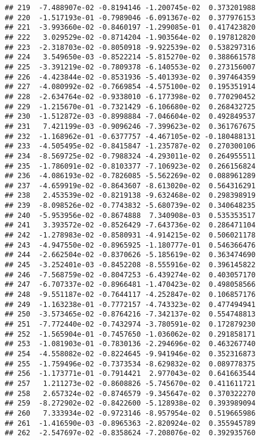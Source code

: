 \documentclass[
]{article}
\begin{document}
\begin{verbatim}
## 219  -7.488907e-02 -0.8194146 -1.200745e-02  0.373201988
## 220  -1.517193e-01 -0.7989046 -6.091367e-02  0.377976153
## 221  -3.993660e-02 -0.8460197 -1.299085e-01  0.417423820
## 222   3.029529e-02 -0.8714204 -1.903564e-02  0.197812820
## 223  -2.318703e-02 -0.8050918 -9.922539e-02  0.538297316
## 224   3.549650e-03 -0.8522214 -5.815270e-02  0.388661578
## 225  -3.391219e-02 -0.7809378 -6.140553e-02  0.273156007
## 226  -4.423844e-02 -0.8531936 -5.401393e-02  0.397464359
## 227  -4.080992e-02 -0.7669854 -4.575100e-02  0.195351914
## 228  -2.634764e-02 -0.9338010 -6.177398e-02  0.770290452
## 229  -1.215670e-01 -0.7321429 -6.106680e-02  0.268432725
## 230  -1.512872e-03 -0.8998884 -7.046604e-02  0.492849537
## 231   7.421199e-03 -0.9096246 -7.399623e-02  0.361767675
## 232  -1.168962e-01 -0.6377757 -4.467105e-02 -0.180488131
## 233  -4.505495e-02 -0.8415847 -1.235787e-02  0.270300106
## 234  -8.569725e-02 -0.7988324 -4.293011e-02  0.264955511
## 235  -1.786091e-02 -0.8103377 -7.106923e-02  0.266156824
## 236  -4.086193e-02 -0.7826085 -5.562269e-02  0.088961289
## 237  -4.659919e-02 -0.8643607 -8.613020e-02  0.564316291
## 238   2.453539e-02 -0.8219138 -9.632468e-02  0.298398919
## 239  -8.098526e-02 -0.7743832 -5.680739e-02  0.340648235
## 240  -5.953956e-02 -0.8674888  7.340908e-03  0.535353517
## 241   3.393572e-02 -0.8526429 -7.643736e-02  0.286471104
## 242  -1.278983e-02 -0.8580931 -4.914215e-02  0.506021178
## 243  -4.947550e-02 -0.8965925 -1.180777e-01  0.546366476
## 244  -2.662504e-02 -0.8370626 -5.185619e-02  0.363474690
## 245  -3.252401e-03 -0.8452208 -8.555916e-02  0.396145822
## 246  -7.568759e-02 -0.8047253 -6.439274e-02  0.403057170
## 247  -6.707337e-02 -0.8966481 -1.470423e-02  0.498058566
## 248  -9.551187e-02 -0.7644117 -4.252847e-02  0.106857176
## 249  -1.163238e-01 -0.7772157 -4.743323e-02  0.477494941
## 250  -3.573465e-02 -0.8764216 -7.342137e-02  0.554748813
## 251  -7.772440e-02 -0.7432974 -3.780591e-02  0.172879230
## 252  -1.565904e-01 -0.7457650 -1.036062e-02  0.291858171
## 253  -1.081903e-01 -0.7830136 -2.294696e-02  0.463267740
## 254  -4.558082e-02 -0.8224645 -9.941946e-02  0.352316873
## 255  -1.759496e-02 -0.7373534 -8.629832e-02  0.089778375
## 256  -1.173771e-01 -0.7914421  2.977043e-02  0.641663544
## 257   1.211273e-02 -0.8608826 -5.745670e-02  0.411611721
## 258   2.657324e-02 -0.8746579 -9.345647e-02  0.370322270
## 259  -8.272902e-02 -0.8422600 -5.128938e-02  0.393989094
## 260   7.333934e-02 -0.9723146 -8.957954e-02  0.519665986
## 261  -1.416590e-03 -0.8965363 -2.820924e-02  0.355945789
## 262  -2.547697e-02 -0.8358624 -7.208076e-02  0.392935760

\end{verbatim}
\end{document}
